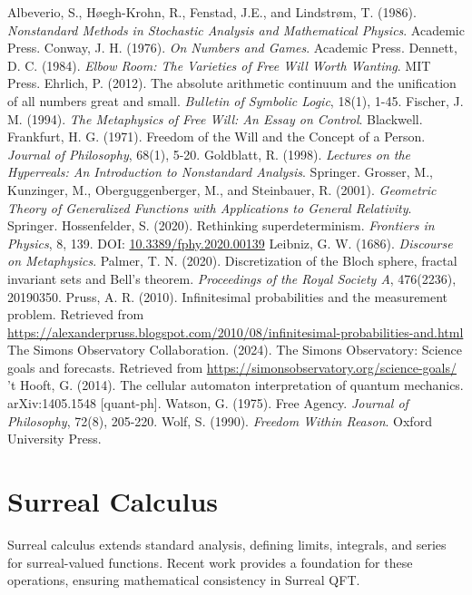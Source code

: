 \documentclass{article}
\begin{document}
\begin{thebibliography}{9}
 Albeverio, S., Høegh-Krohn, R., Fenstad, J.E., and Lindstrøm, T. (1986). \emph{Nonstandard Methods in Stochastic Analysis and Mathematical Physics}. Academic Press.
 Conway, J. H. (1976). \emph{On Numbers and Games}. Academic Press.
 Dennett, D. C. (1984). \emph{Elbow Room: The Varieties of Free Will Worth Wanting}. MIT Press.
 Ehrlich, P. (2012). The absolute arithmetic continuum and the unification of all numbers great and small. \emph{Bulletin of Symbolic Logic}, 18(1), 1-45.
 Fischer, J. M. (1994). \emph{The Metaphysics of Free Will: An Essay on Control}. Blackwell.
 Frankfurt, H. G. (1971). Freedom of the Will and the Concept of a Person. \emph{Journal of Philosophy}, 68(1), 5-20.
 Goldblatt, R. (1998). \emph{Lectures on the Hyperreals: An Introduction to Nonstandard Analysis}. Springer.
 Grosser, M., Kunzinger, M., Oberguggenberger, M., and Steinbauer, R. (2001). \emph{Geometric Theory of Generalized Functions with Applications to General Relativity}. Springer.
 Hossenfelder, S. (2020). Rethinking superdeterminism. \emph{Frontiers in Physics}, 8, 139. DOI: \href{https://doi.org/10.3389/fphy.2020.00139}{10.3389/fphy.2020.00139}
 Leibniz, G. W. (1686). \emph{Discourse on Metaphysics}.
 Palmer, T. N. (2020). Discretization of the Bloch sphere, fractal invariant sets and Bell's theorem. \emph{Proceedings of the Royal Society A}, 476(2236), 20190350.
 Pruss, A. R. (2010). Infinitesimal probabilities and the measurement problem. Retrieved from \url{https://alexanderpruss.blogspot.com/2010/08/infinitesimal-probabilities-and.html}
 The Simons Observatory Collaboration. (2024). The Simons Observatory: Science goals and forecasts. Retrieved from \url{https://simonsobservatory.org/science-goals/}
 't Hooft, G. (2014). The cellular automaton interpretation of quantum mechanics. arXiv:1405.1548 [quant-ph].
 Watson, G. (1975). Free Agency. \emph{Journal of Philosophy}, 72(8), 205-220.
 Wolf, S. (1990). \emph{Freedom Within Reason}. Oxford University Press.
\end{thebibliography}

\appendix
\section{Surreal Calculus}
Surreal calculus extends standard analysis, defining limits, integrals, and series for surreal-valued functions. Recent work \cite{Ehrlich2012} provides a foundation for these operations, ensuring mathematical consistency in Surreal QFT.
\end{document}
